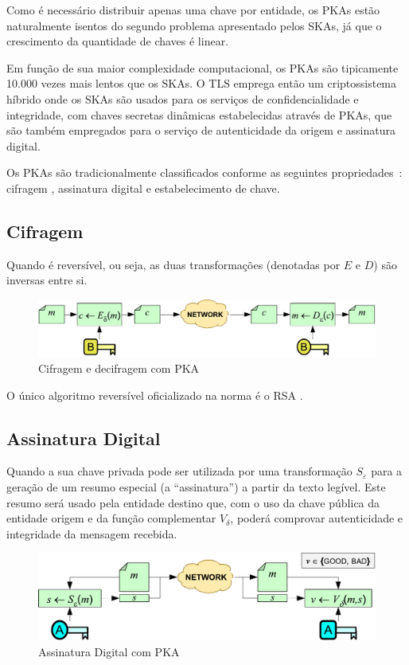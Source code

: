 Como é necessário distribuir apenas uma chave por entidade, os \acsp{PKA} estão naturalmente isentos do
segundo problema apresentado pelos \acsp{SKA}, já que o crescimento da quantidade de chaves é linear.

Em função de sua maior complexidade computacional, os \acsp{PKA} são tipicamente 10.000 vezes mais lentos
que os \acsp{SKA}. O TLS emprega então um criptossistema híbrido
onde os \acsp{SKA} são usados para os serviços de confidencialidade e integridade, com chaves secretas dinâmicas
estabelecidas através de \acsp{PKA}, que são também empregados para o serviço de autenticidade da origem e
assinatura digital.

Os \acsp{PKA} são tradicionalmente classificados conforme as seguintes propriedades~\cite{pki_book}:
cifragem , assinatura digital e estabelecimento de chave. 

\subsection{Cifragem}

Quando é reversível, ou seja, as duas transformações (denotadas por $E$ e $D$) são inversas entre si.

\begin{figure}[htbp]
	\centering
		\includegraphics[scale=0.7]{fig/pk_cipher}
	\caption{Cifragem e decifragem com PKA}
	\label{fig:pk_encryption}
\end{figure}

O único algoritmo reversível oficializado na norma é o \acs{RSA} \cite{rsa}.

\subsection{Assinatura Digital}

Quando a sua chave privada pode ser utilizada por uma transformação $S_\varepsilon$
para a geração de um resumo especial (a ``assinatura'') 
a partir da texto legível. Este resumo será usado pela entidade destino que, com o uso da chave pública
da entidade origem e da função complementar $V_\delta$, poderá comprovar 
autenticidade e integridade da mensagem recebida.

\begin{figure}[htbp]
	\centering
		\includegraphics[scale=0.7]{fig/pk_sign}
	\caption{Assinatura Digital com PKA}
	\label{fig:pk_sign}
\end{figure}

